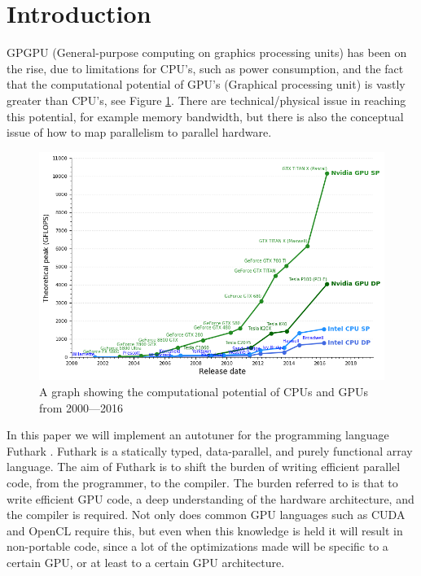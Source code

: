 \section{Introduction}
GPGPU (General-purpose computing on graphics processing units) has been on the
rise, due to limitations for CPU's, such as power consumption, and the fact
that the computational potential of GPU's (Graphical processing unit) is vastly
greater than CPU's, see Figure \ref{potential}. There are technical/physical
issue in reaching this potential, for example memory bandwidth, but there is
also the conceptual issue of how to map parallelism to parallel hardware.
\begin{figure}[h]
	\centering
	\includegraphics[width=.8\textwidth]{resources/graf.png}
	\caption{A graph showing the computational potential of CPUs and GPUs from 2000---2016 \cite{cpu-vs-gpu}}
	\label{potential}
\end{figure}

In this paper we will implement an autotuner for the programming language
Futhark \cite{futhark-home}. Futhark is a statically typed, data-parallel, and
purely functional array language. The aim of Futhark is to shift the burden of
writing efficient parallel code, from the programmer, to the compiler. The
burden referred to is that to write efficient GPU code, a deep understanding of
the hardware architecture, and the compiler is required. Not only does common GPU languages such as CUDA and OpenCL require this, but even when this knowledge is
held it will result in non-portable code, since a lot of the optimizations made
will be specific to a certain GPU, or at least to a certain GPU architecture. 

